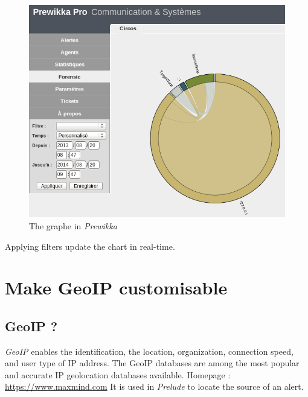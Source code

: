 \documentclass{koala-en}
\begin{document}
\begin{figure}[!ht]
  \center
  \includegraphics[width=15cm]{circosprew.png}
  \caption{The graphe in \emph{Prewikka}}
\end{figure}

Applying filters update the chart in real-time.

\thispagestyle{fancy}
\newpage

\section{Make GeoIP customisable}
\subsection{GeoIP ?}
\emph{GeoIP} enables the identification, the location, organization, connection speed, and user type of IP address. The GeoIP databases are among the most popular and accurate IP geolocation databases available.
\newline
\newline
Homepage : \url{https://www.maxmind.com}
\newline
\newline
It is used in \emph{Prelude} to locate the source of an alert.
\end{document}

